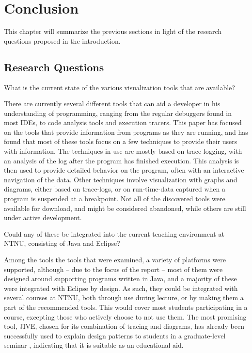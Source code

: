 \chapter{Conclusion}\label{conclusion}

This chapter will summarize the previous sections in light of the research questions proposed in the introduction.

\section{Research Questions}\label{conclusionRQs}


\begin{theorem}
What is the current state of the various visualization tools that are available?
\end{theorem}

There are currently several different tools that can aid a developer in his understanding of programming, ranging from the regular debuggers found in most IDEs, to code analysis tools and execution tracers.
This paper has focused on the tools that provide information from programs as they are running, and has found that most of these tools focus on a few techniques to provide their users with information.
The techniques in use are mostly based on trace-logging, with an analysis of the log after the program has finished execution.
This analysis is then used to provide detailed behavior on the program, often with an interactive navigation of the data.
Other techniques involve visualization with graphs and diagrams, either based on trace-logs, or on run-time-data captured when a program is suspended at a breakpoint.
Not all of the discovered tools were available for download, and might be considered abandoned, while others are still under active development.


\begin{theorem}
Could any of these be integrated into the current teaching environment at NTNU, consisting of Java and Eclipse?
\end{theorem}

Among the tools the tools that were examined, a variety of platforms were supported, although -- due to the focus of the report -- most of them were designed around supporting programs written in Java, and a majority of these were integrated with Eclipse by design.
As such, they could be integrated with several courses at NTNU, both through use during lecture, or by making them a part of the recommended tools.
This would cover most students participating in a course, excepting those who actively choose to not use them.
The most promising tool, JIVE, chosen for its combination of tracing and diagrams, has already been successfully used to explain design patterns to students in a graduate-level seminar \cite[p. 99]{Gestwicki2005}, indicating that it is suitable as an educational aid.


